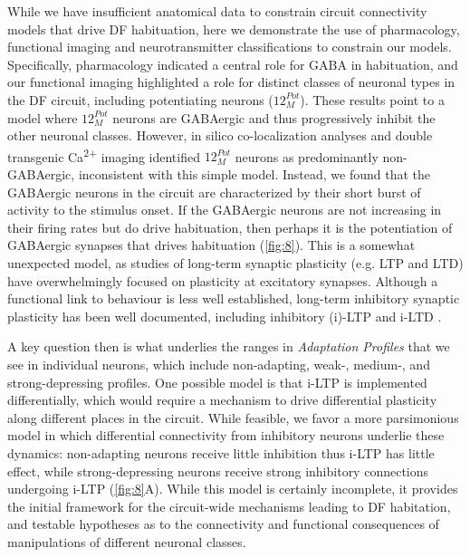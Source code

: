 \documentclass[9pt,lineno]{RandlettLab_elife}
\begin{document}
While we have insufficient anatomical data to constrain circuit connectivity models that drive DF habituation, here we demonstrate the  use of pharmacology, functional imaging and neurotransmitter classifications to constrain our models. Specifically, pharmacology indicated a central role for GABA in habituation, and our functional imaging highlighted a role for distinct classes of neuronal types in the DF circuit, including potentiating neurons ($12_{M}^{Pot}$). These results point to a model where $12_{M}^{Pot}$ neurons are GABAergic and thus progressively inhibit the other neuronal classes. However, in silico co-localization analyses and double transgenic Ca\textsuperscript{2+} imaging identified $12_{M}^{Pot}$ neurons as predominantly non-GABAergic, inconsistent with this simple model. Instead, we found that the GABAergic neurons in the circuit are characterized by their short burst of activity to the stimulus onset. If the GABAergic neurons are not increasing in their firing rates but do drive habituation, then perhaps it is the potentiation of GABAergic synapses that drives habituation (\autoref{fig:8}). This is a somewhat unexpected model, as studies of long-term synaptic plasticity (e.g. LTP and LTD) have overwhelmingly focused on plasticity at excitatory synapses. Although a functional link to behaviour is less well established, long-term inhibitory synaptic plasticity has been well documented, including inhibitory (i)-LTP  and i-LTD \citep{Castillo2011-tq}.

A key question then is what underlies the ranges in \emph{Adaptation Profiles} that we see in individual neurons, which include non-adapting, weak-, medium-, and strong-depressing profiles. One possible model is that i-LTP is implemented differentially, which would require a mechanism to drive differential plasticity along different places in the circuit. While feasible, we favor a more parsimonious model in which differential connectivity from inhibitory neurons underlie these dynamics: non-adapting neurons receive little inhibition thus i-LTP has little effect, while strong-depressing neurons receive strong inhibitory connections undergoing i-LTP (\autoref{fig:8}A). While this  model is certainly incomplete, it provides the initial framework for the circuit-wide mechanisms leading to DF habitation, and testable hypotheses as to the connectivity and functional consequences of manipulations of different neuronal classes.
\end{document}
